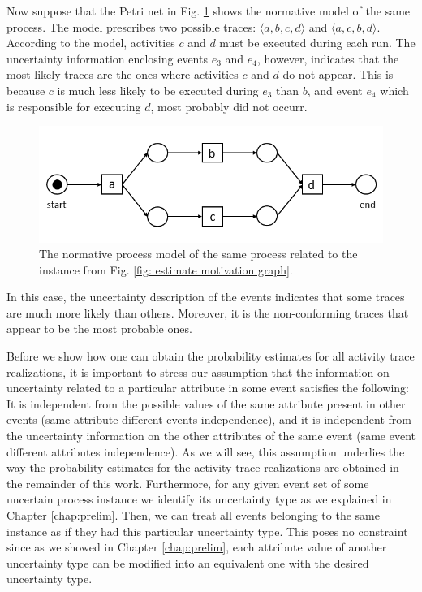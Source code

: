 Now suppose that the Petri net in Fig. \ref{fig: estimate motivation model} shows the normative model of the same process.
The model prescribes two possible traces: $\langle a,b,c,d \rangle$ and $\langle a,c,b,d \rangle$.
According to the model, activities $c$ and $d$ must be executed during each run.
The uncertainty information enclosing events $e_3$ and $e_4$, however, indicates that the most likely traces are the ones where activities $c$ and $d$ do not appear.
This is because $c$ is much less likely to be executed during $e_3$ than $b$, and event $e_4$ which is responsible for executing $d$, most probably did not occurr.
%
\begin{figure}
	\centering
	\includegraphics[width=0.8\columnwidth]{figures/estimate_motivation_model.png}
	\caption{The normative process model of the same process related to the instance from Fig. \ref{fig: estimate motivation graph}.}
	\label{fig: estimate motivation model}
\end{figure}
%
%
%
In this case, the uncertainty description of the events indicates that some traces are much more likely than others.
Moreover, it is the non-conforming traces that appear to be the most probable ones.

Before we show how one can obtain the probability estimates for all activity trace realizations, it is important to stress our assumption that the information on uncertainty related to a particular attribute in some event satisfies the following:
It is independent from the possible values of the same attribute present in other events (same attribute different events independence), and it is independent from the uncertainty information on the other attributes of the same event (same event different attributes independence).
As we will see, this assumption underlies the way the probability estimates for the activity trace realizations are obtained in the remainder of this work.
Furthermore, for any given event set of some uncertain process instance we identify its uncertainty type as we explained in Chapter \ref{chap:prelim}.
Then, we can treat all events belonging to the same instance as if they had this particular uncertainty type.
This poses no constraint since as we showed in Chapter \ref{chap:prelim}, each attribute value of another uncertainty type can be modified into an equivalent one with the desired uncertainty type.

